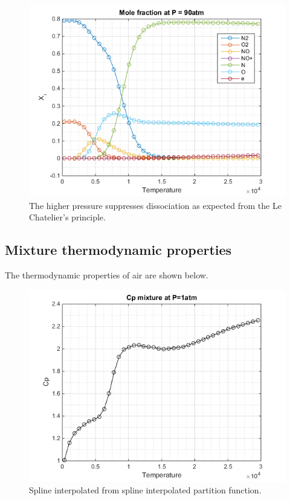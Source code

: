 \documentclass[]{aelab_aiaa-tc}%
\begin{document}
\begin{figure}[h]%
	\includegraphics{comp90atmfig}
	\caption{The higher pressure suppresses dissociation as expected from the Le Chatelier's principle.}
	\end{figure}

\subsection{Mixture thermodynamic properties}

The thermodynamic properties of air are shown below. 

\begin{figure}[h]%
	\includegraphics{Cpair1atmfig}
	\caption{Spline interpolated from spline interpolated partition function.}
	\end{figure}
\end{document}
